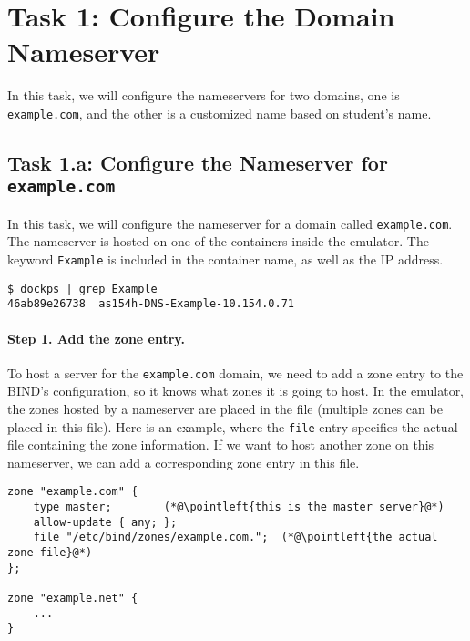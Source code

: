 \section{Task 1: Configure the Domain Nameserver}
\label{dns-inf:sec:task1}

In this task, we will configure the nameservers 
for two domains, one is \texttt{example.com}, 
and the other is a customized name based on 
student's name. 

\subsection{Task 1.a: Configure the Nameserver for \texttt{example.com}} 

In this task, we will configure the nameserver for a domain
called \texttt{example.com}. The nameserver is hosted on 
one of the containers inside the emulator. The keyword \texttt{Example} is 
included in the container name, as well
as the IP address. 

\begin{lstlisting}
$ dockps | grep Example
46ab89e26738  as154h-DNS-Example-10.154.0.71
\end{lstlisting}


\paragraph{Step 1. Add the zone entry.} 
To host a server for the \texttt{example.com} domain, we need to
add a zone entry to the BIND's configuration, 
so it knows what zones it is going to host. 
In the emulator, the zones hosted by a nameserver are placed 
in the  file (multiple zones
can be placed in this file). Here is 
an example, where the \texttt{file} entry specifies
the actual file containing the zone information.  If we want 
to host another zone on this nameserver, we can add a corresponding
zone entry in this file. 

\begin{lstlisting}
zone "example.com" { 
    type master;        (*@\pointleft{this is the master server}@*) 
    allow-update { any; }; 
    file "/etc/bind/zones/example.com.";  (*@\pointleft{the actual zone file}@*) 
};

zone "example.net" {
    ... 
}
\end{lstlisting}


